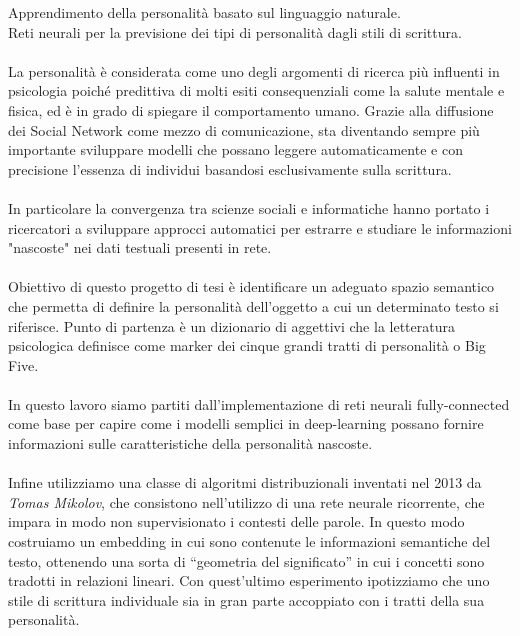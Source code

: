 \documentclass[11pt]{toptesi}
\begin{document}
\sommario
Apprendimento della personalità basato sul linguaggio naturale. \\
Reti neurali per la previsione dei tipi di personalità dagli stili di scrittura.
\\\\
La personalità è considerata come uno degli argomenti di ricerca più influenti in psicologia poiché predittiva di molti esiti consequenziali come la salute mentale e fisica, ed è in grado di spiegare il comportamento umano.
Grazie alla diffusione dei Social Network come mezzo di comunicazione, sta diventando sempre più importante sviluppare modelli che possano leggere automaticamente e con precisione l'essenza di individui basandosi esclusivamente sulla scrittura. 
\\\\
In particolare la convergenza tra scienze sociali e informatiche hanno portato i ricercatori a sviluppare approcci automatici per estrarre e studiare le informazioni "nascoste" nei dati testuali presenti in rete.
\\\\
Obiettivo di questo progetto di tesi è identificare un adeguato spazio semantico che permetta di definire la personalità dell'oggetto a cui un determinato testo si riferisce. Punto di partenza è un dizionario di aggettivi che la letteratura psicologica definisce come marker dei cinque grandi tratti di personalità o Big Five.
\\\\
In questo lavoro siamo partiti dall'implementazione di reti neurali  fully-connected come base per capire come i modelli semplici in deep-learning possano fornire informazioni sulle caratteristiche della personalità nascoste. 
\\\\
Infine utilizziamo una classe di algoritmi distribuzionali inventati nel 2013 da \emph{Tomas Mikolov}, che consistono nell'utilizzo di una rete neurale ricorrente, che impara in modo non supervisionato i contesti delle parole.
In questo modo costruiamo un embedding in cui sono contenute le informazioni semantiche del testo, ottenendo una sorta di “geometria del significato” in cui i concetti sono tradotti in relazioni lineari.
Con quest'ultimo esperimento ipotizziamo che uno stile di scrittura individuale sia in gran parte accoppiato con i tratti della sua personalità.

\end{document}
